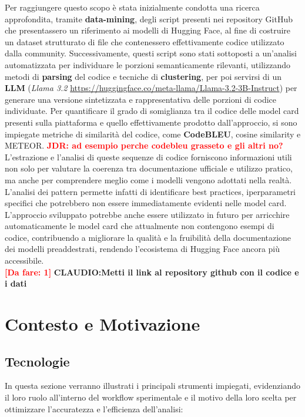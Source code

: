 \documentclass{article}
\newcommand{\dafare}[1]{\textbf{\textcolor{red}{[Da fare: #1]}}}
\newcommand{\JDR}[1]{\textbf{\textcolor{red}{JDR: {#1}}}}
\begin{document}
Per raggiungere questo scopo è stata inizialmente condotta una ricerca approfondita, tramite \textbf{data-mining}, degli script presenti nei repository GitHub che presentassero un riferimento ai modelli di Hugging Face, al fine di costruire un dataset strutturato di file che contenessero effettivamente codice utilizzato dalla community. Successivamente, questi script sono stati sottoposti a un’analisi automatizzata per individuare le porzioni semanticamente rilevanti, utilizzando metodi di \textbf{parsing} del codice e tecniche di \textbf{clustering}, per poi servirsi di un \textbf{LLM} (\textit{Llama 3.2} \url{https://huggingface.co/meta-llama/Llama-3.2-3B-Instruct})  per generare una versione sintetizzata e rappresentativa delle porzioni di codice individuate. Per quantificare il grado di somiglianza tra il codice delle model card presenti sulla piattaforma e quello effettivamente prodotto dall'approccio, si sono impiegate metriche di similarità del codice, come \textbf{CodeBLEU}, cosine similarity e METEOR. \JDR{ad esempio perche codebleu grasseto e gli altri no?}\\
L’estrazione e l’analisi di queste sequenze di codice forniscono informazioni utili non solo per valutare la coerenza tra documentazione ufficiale e utilizzo pratico, ma anche per comprendere meglio come i modelli vengono adottati nella realtà. L’analisi dei pattern permette infatti di identificare best practices, iperparametri specifici che potrebbero non essere immediatamente evidenti nelle model card.\\
L’approccio sviluppato potrebbe anche essere utilizzato in futuro per arricchire automaticamente le model card che attualmente non contengono esempi di codice, contribuendo a migliorare la qualità e la fruibilità della documentazione dei modelli preaddestrati, rendendo l’ecosistema di Hugging Face ancora più accessibile.\\

\dafare{1}
\textbf{CLAUDIO:Metti il link al repository github con il codice e i dati}

\section{Contesto e Motivazione}
\subsection{Tecnologie}
In questa sezione verranno illustrati i principali strumenti impiegati, evidenziando il loro ruolo all'interno del workflow sperimentale e il motivo della loro scelta per ottimizzare l'accuratezza e l'efficienza dell’analisi:
\end{document}
